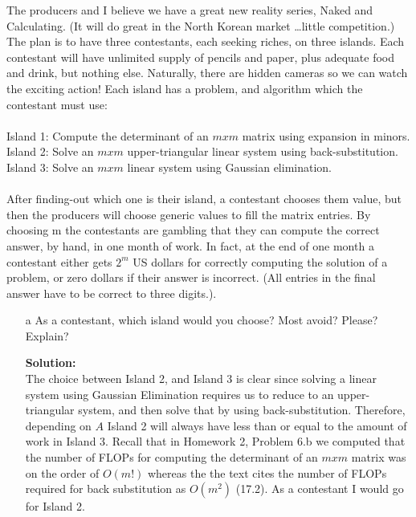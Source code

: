 \documentclass[12pt]{article}
\makeatletter
\theoremstyle{homework}
\newenvironment{exercise}[1]
{\def\@currentlabel{#1}\exercisecore}
{\endexercisecore}
\newcommand{\localhead}[1]{\par\smallskip\noindent\textbf{#1}\nobreak\\}%
\newcommand\solution{\localhead{Solution:}}
\makeatother
\begin{document}
\newpage


\begin{exercise}{F2} 
  The producers and I believe we have a great new reality series, Naked and Calculating. (It will do great in the North Korean market \dots little competition.) The plan is to have three contestants,
  each seeking riches, on three islands. Each contestant will have unlimited supply of pencils and paper, plus adequate
  food and drink, but nothing else. Naturally, there are hidden cameras so we can watch the exciting action! Each island has a
  problem, and algorithm which the contestant must use:\\\\
  Island 1: Compute the determinant of an $mxm$ matrix using expansion in minors.\\
  Island 2: Solve an $mxm$ upper-triangular linear system using back-substitution.\\
  Island 3: Solve an $mxm$ linear system using Gaussian elimination.\\\\
  After finding-out which one is their island, a contestant chooses them value, but then the producers will choose generic
  values to fill the matrix entries.  By choosing m the contestants are gambling that they can compute the correct answer,
  by hand, in one month of work. In fact, at the end of one month a contestant either gets $2^m$ US dollars for correctly computing
  the solution of a problem, or zero dollars if their answer  is incorrect. (All entries in the final answer have to be correct to three digits.).\\
   \begin{enumerate}
     \item[a] As a contestant, which island would you choose? Most avoid? Please? Explain?\\
     \solution The choice between Island 2, and Island 3 is clear since solving a linear system using Gaussian Elimination requires us to reduce to an upper-triangular system, and then
     solve that by using back-substitution. Therefore, depending on $A$ Island 2 will always have less than or equal to the amount of work in Island 3. Recall that in Homework 2, Problem 6.b we computed that the number of FLOPs 
     for computing the determinant of an $mxm$ matrix was on the order of $O(m!)$ whereas the the text cites the number of FLOPs required for back substitution as $O(m^2)$ (17.2). As a contestant I would go for Island 2. 
    \vspace{.25in}



\end{enumerate}
\end{exercise}
\end{document}
